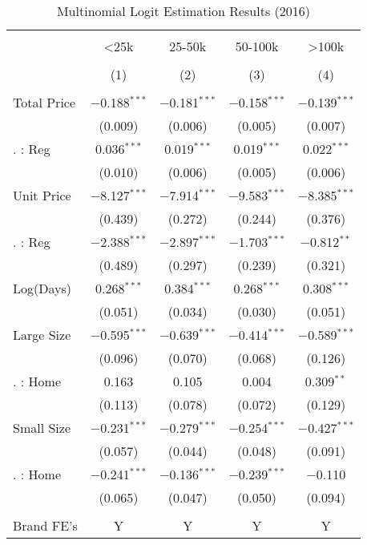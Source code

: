 \begin{table}[!htbp] \centering
  \caption{Multinomial Logit Estimation Results (2016)}
  \label{tab:mlogit2016}
\begin{tabular}{@{\extracolsep{5pt}}lcccc}
\\[-1.8ex]\hline
\hline \\[-1.8ex]
 & <25k & 25-50k & 50-100k & >100k \\
\\[-1.8ex] & (1) & (2) & (3) & (4)\\
\hline \\[-1.8ex]
 Total Price & $-$0.188$^{***}$ & $-$0.181$^{***}$ & $-$0.158$^{***}$ & $-$0.139$^{***}$ \\
  & (0.009) & (0.006) & (0.005) & (0.007) \\
  . : Reg & 0.036$^{***}$ & 0.019$^{***}$ & 0.019$^{***}$ & 0.022$^{***}$ \\
  & (0.010) & (0.006) & (0.005) & (0.006) \\
  Unit Price & $-$8.127$^{***}$ & $-$7.914$^{***}$ & $-$9.583$^{***}$ & $-$8.385$^{***}$ \\
  & (0.439) & (0.272) & (0.244) & (0.376) \\
  . : Reg & $-$2.388$^{***}$ & $-$2.897$^{***}$ & $-$1.703$^{***}$ & $-$0.812$^{**}$ \\
  & (0.489) & (0.297) & (0.239) & (0.321) \\
  Log(Days) & 0.268$^{***}$ & 0.384$^{***}$ & 0.268$^{***}$ & 0.308$^{***}$ \\
  & (0.051) & (0.034) & (0.030) & (0.051) \\
  Large Size & $-$0.595$^{***}$ & $-$0.639$^{***}$ & $-$0.414$^{***}$ & $-$0.589$^{***}$ \\
  & (0.096) & (0.070) & (0.068) & (0.126) \\
  . : Home & 0.163 & 0.105 & 0.004 & 0.309$^{**}$ \\
  & (0.113) & (0.078) & (0.072) & (0.129) \\
  Small Size & $-$0.231$^{***}$ & $-$0.279$^{***}$ & $-$0.254$^{***}$ & $-$0.427$^{***}$ \\
  & (0.057) & (0.044) & (0.048) & (0.091) \\
  . : Home & $-$0.241$^{***}$ & $-$0.136$^{***}$ & $-$0.239$^{***}$ & $-$0.110 \\
  & (0.065) & (0.047) & (0.050) & (0.094) \\
 \hline \\[-1.8ex]
Brand FE's & Y & Y & Y & Y \\

\end{tabular}
\end{table}
